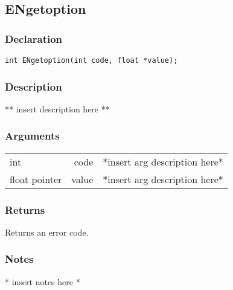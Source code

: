 \subsection{ENgetoption}
\subsubsection{Declaration}
\begin{lstlisting}
int ENgetoption(int code, float *value);
\end{lstlisting}
\subsubsection{Description}
** insert description here **
\subsubsection{Arguments}
\begin{tabular}{l r p{11cm} }
int&code&*insert arg description here* \\[6pt]
float pointer&value&*insert arg description here* \\[6pt]
\end{tabular}
\subsubsection{Returns}
Returns an error code.
\subsubsection{Notes}
* insert notes here *